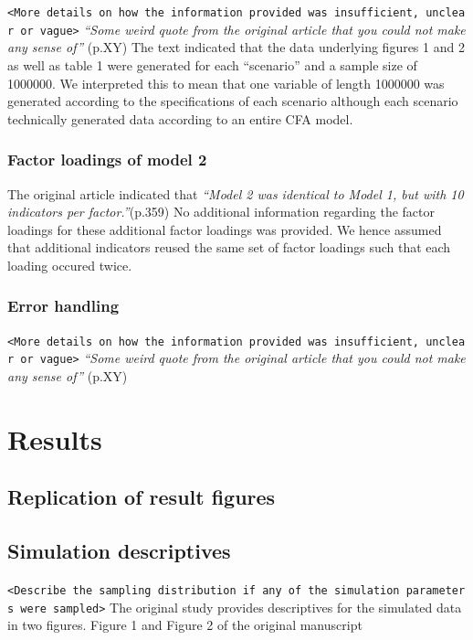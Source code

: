 \documentclass[10,a4paperpaper,]{article}
\begin{document}
\texttt{\textless{}More\ details\ on\ how\ the\ information\ provided\ was\ insufficient,\ unclear\ or\ vague\textgreater{}}
\emph{``Some weird quote from the original article that you could not
make any sense of''} (p.XY) The text indicated that the data underlying
figures 1 and 2 as well as table 1 were generated for each ``scenario''
and a sample size of 1000000. We interpreted this to mean that one
variable of length 1000000 was generated according to the specifications
of each scenario although each scenario technically generated data
according to an entire CFA model.

\subsubsection{Factor loadings of model 2}

The original article indicated that \emph{``Model 2 was identical to
Model 1, but with 10 indicators per factor.''}(p.359) No additional
information regarding the factor loadings for these additional factor
loadings was provided. We hence assumed that additional indicators
reused the same set of factor loadings such that each loading occured
twice.

\subsubsection{Error handling}

\texttt{\textless{}More\ details\ on\ how\ the\ information\ provided\ was\ insufficient,\ unclear\ or\ vague\textgreater{}}
\emph{``Some weird quote from the original article that you could not
make any sense of''} (p.XY)

\section{Results}

\subsection{Replication of result figures}
\subsection{Simulation descriptives}

\texttt{\textless{}Describe\ the\ sampling\ distribution\ if\ any\ of\ the\ simulation\ parameters\ were\ sampled\textgreater{}}
The original study provides descriptives for the simulated data in two
figures. Figure 1 and Figure 2 of the original manuscript
\end{document}
